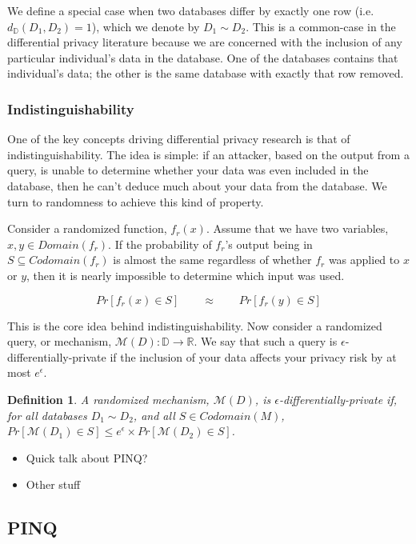 \documentclass[12pt]{article}
\newtheorem{defn}{Definition}[section]
\begin{document}
We define a special case when two databases differ by exactly one row (i.e. $d_\mathbb{D}(D_1,D_2)=1$), which we denote by $D_1 \sim D_2$.
This is a common-case in the differential privacy literature because we are concerned with the inclusion of any particular individual's data in the database.
One of the databases contains that individual's data; the other is the same database with exactly that row removed.

\subsubsection{Indistinguishability}

One of the key concepts driving differential privacy research is that of indistinguishability.
The idea is simple: if an attacker, based on the output from a query, is unable to determine whether your data was even included in the database, then he can't deduce much about your data from the database.
We turn to randomness to achieve this kind of property.

Consider a randomized function, $f_r(x)$.
Assume that we have two variables, $x, y \in Domain(f_r)$.
If the probability of $f_r$'s output being in $S \subseteq Codomain(f_r)$ is almost the same regardless of whether $f_r$ was applied to $x$ or $y$, then it is nearly impossible to determine which input was used.

\[
  Pr[f_r(x)\in S] \qquad\approx\qquad  Pr[f_r(y)\in S]
\]

This is the core idea behind indistinguishability.
Now consider a randomized query, or mechanism, $\mathcal{M}(D) : \mathbb{D} \rightarrow \mathbb{R}$.
We say that such a query is $\epsilon$-differentially-private if the inclusion of your data affects your privacy risk by at most $e^\epsilon$.

\begin{defn}\label{def:diffpriv}
  A randomized mechanism, $\mathcal{M}(D)$, is $\epsilon$-differentially-private if, for all databases $D_1 \sim D_2$, and all $S \in Codomain(M)$,
  $Pr[\mathcal{M}(D_1)\in S] \le e^\epsilon \times Pr[\mathcal{M}(D_2)\in S]$.
\end{defn}

\begin{itemize}
  \item Quick talk about PINQ?
  \item Other stuff
\end{itemize}

\subsection{PINQ}
\end{document}
